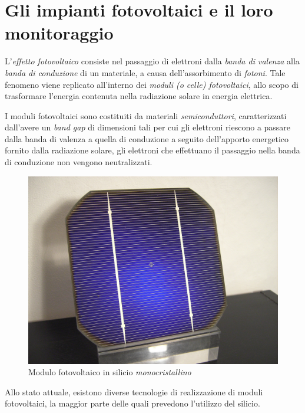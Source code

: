 \clearpage{\pagestyle{empty}\cleardoublepage}
\chapter{Gli impianti fotovoltaici e il loro monitoraggio}
%
L'\emph{effetto fotovoltaico} consiste nel passaggio di elettroni 
dalla \emph{banda di valenza} alla \emph{banda di conduzione} di 
un materiale, a causa dell'assorbimento di \emph{fotoni}. 
%
Tale fenomeno viene replicato all'interno dei \emph{moduli (o celle) 
fotovoltaici}, allo scopo di trasformare l'energia contenuta nella 
radiazione solare in energia elettrica.
%

%
I moduli fotovoltaici sono costituiti da materiali \emph{semiconduttori}, 
caratterizzati dall'avere un \emph{band gap} di dimensioni tali 
per cui  gli elettroni riescono a passare dalla 
banda di valenza a quella di conduzione a seguito dell'apporto 
energetico fornito dalla radiazione solare,
 gli elettroni che effettuano il passaggio nella banda 
di conduzione non vengono neutralizzati.
%
\begin{figure}[!h]
\centering
\includegraphics[width=350pt]{img/modulo-fotovoltaico.jpg}
\caption{Modulo fotovoltaico in silicio \emph{monocristallino}}
\end{figure}
%
Allo stato attuale, esistono diverse tecnologie di realizzazione di 
moduli fotovoltaici, la maggior parte delle quali prevedono l'utilizzo 
del silicio.








